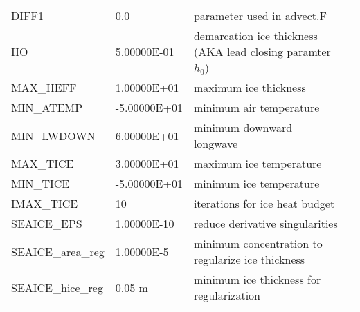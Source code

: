 \begin{table}[!ht]
{\begin{tabular}{|llp{5cm}c|}
    DIFF1               &                   0.0
    &   parameter used in advect.F 
    &  %
    \\
   HO                  &                   5.00000E-01
    &   demarcation ice thickness (AKA lead closing paramter $h_0$)
    &  %
    \\
   MAX\_HEFF            &                   1.00000E+01
    &   maximum ice thickness 
    &  %
    \\
   MIN\_ATEMP           &                  -5.00000E+01
    &   minimum air temperature 
    &  %
    \\
   MIN\_LWDOWN          &                   6.00000E+01
    &   minimum downward longwave 
    &  %
    \\
   MAX\_TICE            &                   3.00000E+01
    &   maximum ice temperature 
    &  %
    \\
   MIN\_TICE            &                  -5.00000E+01
    &   minimum ice temperature 
    &  %
    \\
   IMAX\_TICE           &                        10
    &   iterations for ice heat budget 
    &  %
    \\
   SEAICE\_EPS          &                   1.00000E-10
    &   reduce derivative singularities 
    &  %
    \\
   SEAICE\_area\_reg    &                   1.00000E-5
    &   minimum concentration to regularize ice thickness
    &  %
    \\
   SEAICE\_hice\_reg    &                   0.05 m
    &   minimum ice thickness for regularization
    &  %
    \\
\hline
\end{tabular}
}
\end{table}

